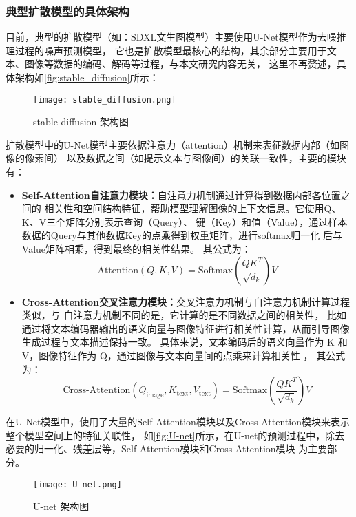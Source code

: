 \subsubsection{典型扩散模型的具体架构}
\par
目前，典型的扩散模型（如：SDXL文生图模型）主要使用U-Net模型作为去噪推理过程的噪声预测模型，
它也是扩散模型最核心的结构，其余部分主要用于文本、图像等数据的编码、解码等过程，与本文研究内容无关，
这里不再赘述，具体架构如\autoref{fig:stable_diffusion}所示：
\begin{figure}[ht]
    \centering
    \texttt{[image: stable\_diffusion.png]}
    \caption{\label{fig:stable_diffusion}stable diffusion 架构图}
\end{figure}
\par
扩散模型中的U-Net模型主要依据注意力（attention）机制来表征数据内部（如图像的像素间）
以及数据之间（如提示文本与图像间）的关联一致性\cite{Ronneberger2015UNetCN, Radford2021LearningTV, Kruger2023TheAB}，主要的模块有：
\begin{itemize}
    \item {\bfseries Self-Attention自注意力模块：}自注意力机制通过计算得到数据内部各位置之间的
    相关性和空间结构特征，帮助模型理解图像的上下文信息。它使用Q、K、V三个矩阵分别表示查询（Query）、
    键（Key）和值（Value），通过样本数据的Query与其他数据Key的点乘得到权重矩阵，进行softmax归一化
    后与Value矩阵相乘，得到最终的相关性结果\cite{Kruger2023TheAB, Liu2024TowardsUC}。
    其公式为：  
    \begin{equation}
        \text{Attention}(Q, K, V) = \text{Softmax}\left(\frac{QK^T}{\sqrt{d_k}}\right)V
    \end{equation}
    \item {\bfseries Cross-Attention交叉注意力模块：}交叉注意力机制与自注意力机制计算过程类似，与
    自注意力机制不同的是，它计算的是不同数据之间的相关性，
    比如通过将文本编码器输出的语义向量与图像特征进行相关性计算，从而引导图像生成过程与文本描述保持一致。
    具体来说，文本编码后的语义向量作为 K 和 V，图像特征作为 Q，通过图像与文本向量间的点乘来计算相关性
    \cite{Saharia2022PhotorealisticTD, Liu2024TowardsUC}，
    其公式为：
    \begin{equation}
        \text{Cross-Attention}(Q_{\text{image}}, K_{\text{text}}, V_{\text{text}}) = \text{Softmax}\left(\frac{QK^T}{\sqrt{d_k}}\right)V
    \end{equation}
\end{itemize}
\par
在U-Net模型中，使用了大量的Self-Attention模块以及Cross-Attention模块来表示整个模型空间上的特征关联性，
如\autoref{fig:U-net}所示，在U-net的预测过程中，除去必要的归一化、残差层等，Self-Attention模块和Cross-Attention模块
为主要部分。
\begin{figure}[ht]
    \centering
    \texttt{[image: U-net.png]}
    \caption{\label{fig:U-net}U-net 架构图\cite{U-Net}}
\end{figure}
